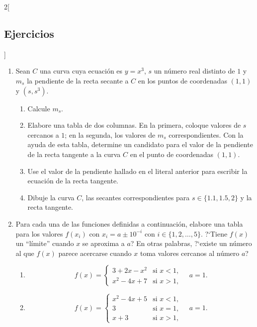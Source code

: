 \begin{multicols}{2}[\subsection{Ejercicios}]
\begingroup
\small
\begin{enumerate}[leftmargin=*]
\item Sean $C$ una curva cuya ecuación es $y = x^3$, $s$ un número real distinto de $1$ y $m_s$
    la pendiente de la recta secante a $C$ en los puntos de coordenadas $(1,1)$ y $(s,s^3)$.
    \begin{enumerate}[leftmargin=*]
    \item Calcule $m_s$.
    \item Elabore una tabla de dos columnas. En la primera, coloque valores de $s$ cercanos
        a $1$; en la segunda, los valores de $m_s$ correspondientes. Con la ayuda de esta
        tabla, determine un candidato para el valor de la pendiente de la recta tangente a
        la curva $C$ en el punto de coordenadas $(1,1)$.
    \item Use el valor de la pendiente hallado en el literal anterior para escribir la
        ecuación de la recta tangente.
    \item Dibuje la curva $C$, las secantes correspondientes para $s\in\{1.1, 1.5, 2\}$ y
        la recta tangente.
    \end{enumerate}
\item Para cada una de las funciones definidas a continuación, elabore una tabla para los
    valores $f(x_i)$ con $x_i = a \pm 10^{-i}$ con $i\in\{1,2,\ldots, 5\}$. ?`Tiene $f(x)$ un
    ``límite'' cuando $x$ se aproxima a $a$? En otras palabras, ?`existe un número al que $f(x)$
    parece acercarse cuando $x$ toma valores cercanos al número $a$?
    \begin{enumerate}[leftmargin=*]
    \item
    \[
    f(x) =
        \begin{cases}
        3 + 2x - x^2 & \text{si } x < 1, \\
        x^2 - 4x + 7 & \text{si } x > 1,
        \end{cases}
        \quad\text{$a = 1$.}
    \]

    \item
    \[
    f(x) =
        \begin{cases}
        x^2 - 4x + 5 & \text{si } x < 1, \\
        3 & \text{si } x = 1, \\
        x + 3 & \text{si } x > 1,
        \end{cases}
        \quad a = 1.
    \]


\end{enumerate}
\end{enumerate}
\end{multicols}
